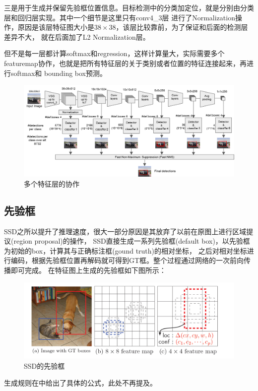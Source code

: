 三是用于生成并保留先验框位置信息。目标检测中的分类加定位，就是分别由分类层和回归层实现。其中一个细节是这里只有conv4\_3层
进行了Normalization操作，原因是该层特征图大小是$38 \times 38$，该层比较靠前，为了保证和后面的检测层差异不大，
就在后面加了L2 Normalization层。
\par
但不是每一层都计算softmax和regression，这样计算量大，实际需要多个featuremap协作，也就是把所有特征层的关于类别或者位置的特征连接起来，再进行softmax和
bounding box预测。
\begin{figure}[H]
	\centering
	\setlength{\abovecaptionskip}{-1cm}  
	\includegraphics[width=1\textwidth]{figures/liucheng.png}
	\caption{多个特征层的协作}
\end{figure}
\subsection{先验框}
\par
SSD之所以提升了推理速度，很大一部分原因是其放弃了以前在原图上进行区域提议(region proposal)的操作，
SSD直接生成一系列先验框(default box)，以先验框为初始的box，计算其与正确标注框(gound truth)的相对坐标，
之后对相对坐标进行编码，根据先验框位置再解码就可得到GT框。整个过程通过网络的一次前向传播即可完成。
在特征图上生成的先验框如下图所示：
\begin{figure}[H]
	\centering
	\setlength{\abovecaptionskip}{0cm}  
	\includegraphics[scale=0.45]{figures/SSD.png}
	\caption{SSD的先验框}
\end{figure}
生成规则在中给出了具体的公式，此处不再提及。
